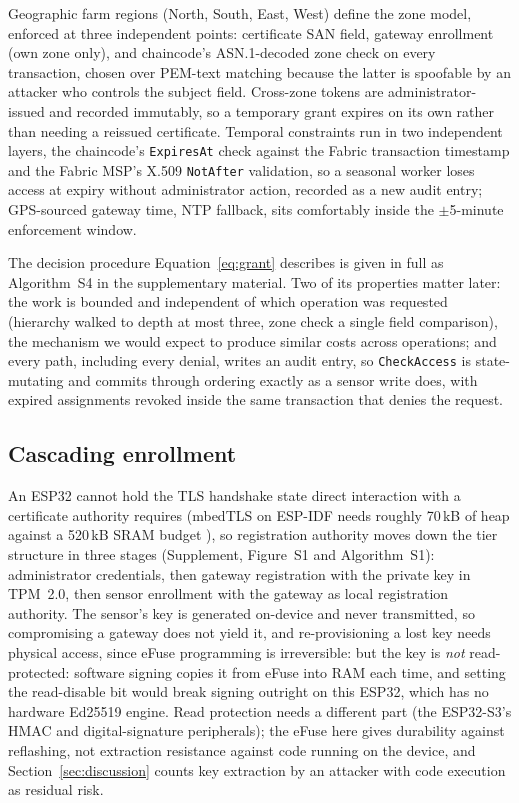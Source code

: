 \documentclass[a4paper,fleqn]{cas-dc}
\begin{document}
Geographic farm regions (North, South, East, West) define the zone model,
enforced at three independent points: certificate SAN field, gateway
enrollment (own zone only), and chaincode's ASN.1-decoded zone check on
every transaction, chosen over PEM-text matching because the latter is
spoofable by an attacker who controls the subject field. Cross-zone
tokens are administrator-issued and recorded immutably, so a temporary
grant expires on its own rather than needing a reissued certificate.
Temporal constraints run in two independent layers, the chaincode's
\texttt{ExpiresAt} check against the Fabric transaction timestamp and the
Fabric MSP's X.509 \texttt{NotAfter} validation, so a seasonal worker
loses access at expiry without administrator action, recorded as a new
audit entry; GPS-sourced gateway time, NTP fallback, sits comfortably
inside the $\pm$5-minute enforcement window.

The decision procedure Equation~\eqref{eq:grant} describes is given in
full as Algorithm~S4 in the supplementary material. Two of its properties
matter later: the work is bounded and independent of which operation was
requested (hierarchy walked to depth at most three, zone check a single
field comparison), the mechanism we would expect to produce similar costs
across operations; and every path, including every denial, writes an
audit entry, so \texttt{CheckAccess} is state-mutating and commits through
ordering exactly as a sensor write does, with expired assignments revoked
inside the same transaction that denies the request.

\subsection{Cascading enrollment}
\label{subsec:enrollment}

An ESP32 cannot hold the TLS handshake state direct interaction with a
certificate authority requires (mbedTLS on ESP-IDF needs roughly 70\,kB of
heap against a 520\,kB SRAM budget \cite{raza2013lithe}), so registration
authority moves down the tier structure in three stages (Supplement,
Figure~S1 and Algorithm~S1): administrator credentials, then gateway
registration with the private key in TPM~2.0, then sensor enrollment with
the gateway as local registration authority. The sensor's key is generated
on-device and never transmitted, so compromising a gateway does not yield
it, and re-provisioning a lost key needs physical access, since eFuse
programming is irreversible: but the key is \emph{not} read-protected:
software signing copies it from eFuse into RAM each time, and setting the
read-disable bit would break signing outright on this ESP32, which has no
hardware Ed25519 engine. Read protection needs a different part (the
ESP32-S3's HMAC and digital-signature peripherals); the eFuse here gives
durability against reflashing, not extraction resistance against code
running on the device, and Section~\ref{sec:discussion} counts key
extraction by an attacker with code execution as residual risk.
\end{document}
